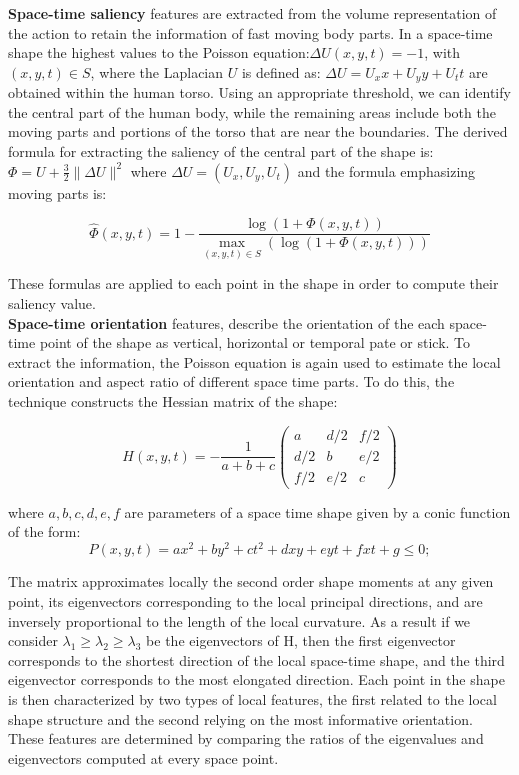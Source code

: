 \documentclass[11pt]{report}
\begin{document}
\textbf{Space-time saliency} features are extracted from the volume representation of the action to retain the information of fast moving body parts. In a space-time shape the highest values to the Poisson equation:\(\Delta U(x,y,t) = -1 \), with \((x,y,t) \in S\), where the Laplacian \(U\) is defined as: \(\Delta U = U_xx + U_yy + U_tt\) are obtained within the human torso. Using an appropriate threshold, we can identify the central part of the human body, while the remaining areas include both the moving parts and portions of the torso that are near the boundaries. The derived formula for extracting the saliency of the central part of the shape is:\(\Phi = U + \frac{3}{2} \| \Delta U \|^2 \) where \(\Delta U = (U_x, U_y, U_t) \) and the formula emphasizing moving parts is: 

\begin{equation}
\hat{\Phi}(x,y,t) = 1 - \frac{\log(1+ \Phi(x,y,t))}{\max_{(x,y,t) \in S}(\log(1+ \Phi(x,y,t)))} 
\end{equation}

These formulas are applied to each point in the shape in order to compute their saliency value. \\

\textbf{Space-time orientation} features, describe the orientation of the each space-time point of the shape as vertical, horizontal or temporal pate or stick. To extract the information, the Poisson equation is again used to estimate the local orientation and aspect ratio of different space time parts. To do this, the technique constructs the Hessian matrix of the shape:

\begin{equation}
H(x,y,t) = - \frac{1}{a+b+c}\begin{pmatrix} a & d/2 & f/2 \\ d/2 & b & e/2 \\ f/2 & e/2 & c \end{pmatrix}
\end{equation}

where \(a, b, c, d, e, f\) are parameters of a space time shape given by a conic function of the form: 
\begin{equation}
P(x,y,t) = ax^2 + by^2 + ct^2 + dxy + eyt + fxt + g \leq 0;
\end{equation}

The matrix approximates locally the second order shape moments at any given point, its eigenvectors corresponding to the local principal directions, and are inversely proportional to the length of the local curvature. As a result if we consider \( \lambda_1  \geq \lambda_2 \geq \lambda_3 \) be the eigenvectors of H, then the first eigenvector corresponds to the shortest direction of the local space-time shape, and the third eigenvector corresponds to the most elongated direction. Each point in the shape is then characterized by two types of local features, the first related to the local shape structure and the second relying on the most informative orientation. These features are determined by comparing the ratios of the eigenvalues and eigenvectors computed at every space point. \\
\end{document}
